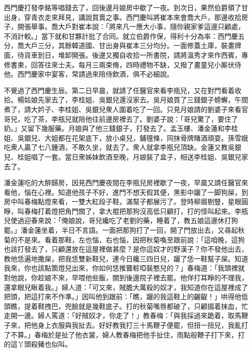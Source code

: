西門慶打發李銘等唱錢去了，回後邊月娘房中歇了一夜。到次日，果然伯爵領了甘出身，穿青衣走來拜見，講說買賣之事。西門慶叫將崔本來會喬大戶，那邊收拾房子，開張舉事。喬大戶對崔本說：「將來凡一應大小事，隨你親家爹這邊只顧處，不消計較。」當下就和甘夥計批了合同。就立伯爵作保，得利十分為率：西門慶五分，喬大戶三分，其餘韓道國、甘出身與崔本三分均分。一面修蓋土庫，裝畫牌面，待貨車到日，堆卸開張。後邊又獨自收拾一所書院，請將溫秀才來作西賓，專修書柬，回答往來士夫。每月三兩束脩，四時禮物不缺，又撥了畫童兒小厮伏侍他。{}西門慶家中宴客，常請過來陪侍飲酒，俱不必細說。

不覺過了西門慶生辰。第二日早晨，就請了任醫官來看李瓶兒，又在對門看着收拾。楊姑娘先家去了，李桂姐、吳銀兒還沒家去。吳月娘買了三錢銀子螃蠏，午間煮了，請大妗子、李桂姐、吳銀兒衆人圍着吃了一回。只見月娘請的劉婆子來看官哥兒，吃了茶，李瓶兒就陪他往前邊房裡去了。劉婆子說：「哥兒驚了，要住了奶。」又留下幾服藥。月娘與了他三錢銀子，打發去了。孟玉樓、潘金蓮和李桂姐、吳銀兒、大姐都在花架底下，放小桌兒，鋪氊條，同抹骨牌賭酒頑耍。孫雪娥吃衆人贏了七八鍾酒，不敢久坐，就去了。衆人就拿李瓶兒頂缺。金蓮又教吳銀兒、桂姐唱了一套。當日衆姊妹飲酒至晚，月娘裝了盒子，相送李桂姐、吳銀兒家去了。

潘金蓮吃的大醉歸房，因見西門慶夜間在李瓶兒房裡歇了一夜，早晨又請任醫官來看他，惱在心裡。知道他孩子不好，進門不想天假其便，黑影中躧了一脚狗屎，到房中叫春梅點燈來看，一雙大紅段子鞋，滿幫子都展污了。登時柳眉剔豎，星眼圓睜，叫春梅打着燈把角門關了，拿大棍把那狗沒高低只顧打，打的怪叫起來。李瓶兒使過迎春來說：「俺娘說，哥兒纔吃了老劉的藥，睡着了，教五娘這邊休打狗罷。」潘金蓮坐着，半日不言語。一面把那狗打了一回，開了門放出去，又尋起秋菊的不是來。看着那鞋，左也惱，右也惱，因把秋菊喚至跟前說：「這咱晚，這狗也該打發去了，只顧還放在這屋裡做甚麼？是你這奴才的野漢子？你不發他出去，教他恁遍地撒屎，{}把我恁雙新鞋兒，連今日纔三四日兒，躧了恁一鞋幫子屎。知道我來，你也該點箇燈兒出來，你如何恁推聾粧啞裝憨兒的？」春梅道：「我頭裡就對他說，你趁娘不來，早喂他些飯，關到後邊院子裡去罷。他佯打耳睜的不理我，還拿眼兒瞅着我。」婦人道：「可又來，賊膽大萬殺的奴才，我知道你在這屋裡成了把頭，把這打來不作準。」因叫他到跟前：「瞧，躧的我這鞋上的齷齪！」哄得他低頭瞧，提着鞋拽巴，兜臉就是幾鞋底子。打的秋菊嘴唇都破了，只顧搵着抹血，忙走開一邊。婦人罵道：「好賊奴才，你走了！」教春梅：「與我採過來跪着，取馬鞭子來，把他身上衣服與我扯去。好好教我打三十馬鞭子便罷，但扭一扭兒，我亂打了不算。」春梅於是扯了他衣裳，婦人教春梅把他手扯住，雨點般鞭子打下來，打的這丫頭殺豬也似叫。

